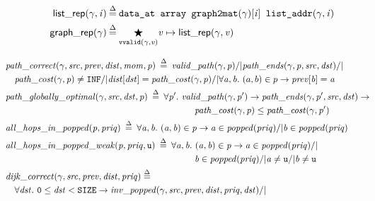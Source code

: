 

\begin{equation*}
\begin{split}
\p{list\_rep}(\gamma, \m{i}) &\defeq \texttt{data\_at  array  graph2mat}(\gamma)[\m{i}] \texttt{  list\_addr}(\gamma, \m{i}) \\
\vspace{1em}
\p{graph\_rep}(\gamma) &\defeq \underset{\texttt{vvalid}(\gamma,\m{v})}{\bigstar} \m{v}  \mapsto\p{list\_rep}(\gamma, \m{v})
\end{split}
\end{equation*}

\begin{equation*}
\begin{split}
&\!\!\!\!\!\!\m{path\_correct}(\gamma, \m{src}, \m{prev}, \m{dist}, \m{mom}, \m{p}) \; \defeq \; 
\m{valid\_path}(\gamma, \m{p}) /| \m{path\_ends}(\gamma, \m{p}, \m{src}, \m{dst}) /| \null \\
&\m{path\_cost}(\gamma, \m{p}) \not= \texttt{INF} /| \m{dist}[\m{dst}] = \m{path\_cost}(\gamma, \m{p}) /| \forall \m{a, b}.~\m(a,b) \in p -> \m{prev}[\m{b}] = \m{a} \\
\vspace{2em}
&\!\!\!\!\!\!\m{path\_globally\_optimal}(\gamma, \m{src}, \m{dst}, \m{p}) \; \defeq \; 
\forall \m{p'}.~\m{valid\_path}(\gamma, \m{p'}) -> \m{path\_ends}(\gamma, \m{p'}, \m{src}, \m{dst}) -> \\
&\hspace{20em}\m{path\_cost}(\gamma, \m{p}) \le \m{path\_cost}(\gamma, \m{p'}) \\
&\!\!\!\!\!\!\m{all\_hops\_in\_popped}(\m{p}, \m{priq}) \; \defeq \; 
\forall \m{a, b}.~\m{(a, b)} \in \m{p} -> \m{a} \in \m{popped}(\m{priq}) /| \m{b} \in \m{popped}(\m{priq})\\
&\!\!\!\!\!\!\m{all\_hops\_in\_popped\_weak}(\m{p}, \m{priq}, \texttt{u}) \; \defeq \; 
\forall \m{a, b}.~\m{(a, b)} \in \m{p} -> \m{a} \in \m{popped}(\m{priq}) /| \null \\ 
&\hspace{20em}\m{b} \in \m{popped}(\m{priq}) /| \m{a} \not= \texttt{u} /| \m{b} \not= \texttt{u} \\
\vspace{4em}
&\!\!\!\!\!\!\m{dijk\_correct}(\gamma, \m{src}, \m{prev}, \m{dist}, \m{priq}) \; \defeq \; \\
&\forall \m{dst}.~\texttt{0} \le \m{dst} < \texttt{SIZE} -> \m{inv\_popped}(\gamma, \m{src}, \m{prev}, \m{dist}, \m{priq}, \m{dst}) /| \null \\

\end{split}
\end{equation*}
